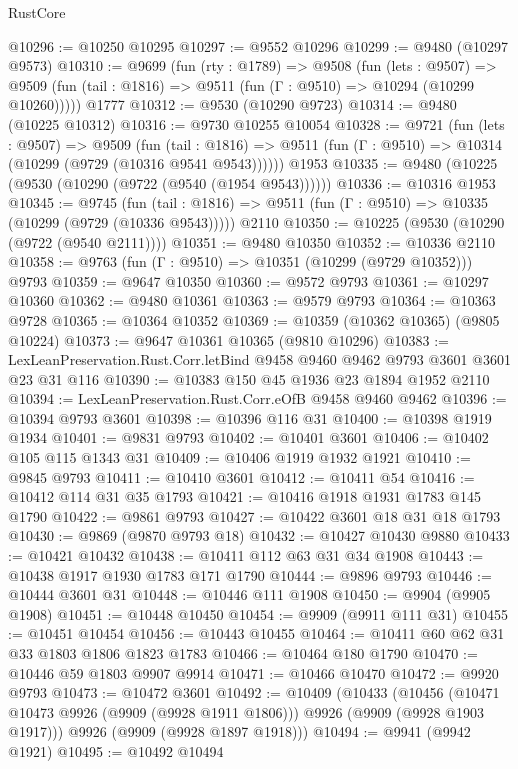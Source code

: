 \begin{lexlean}{RustCore}
\begin{coremodule}
@10296 := @10250 @10295
@10297 := @9552 @10296
@10299 := @9480 (@10297 @9573)
@10310 := @9699
    (fun (rty : @1789) =>
    @9508
      (fun (lets : @9507) =>
      @9509 (fun (tail : @1816) => @9511 (fun (Γ : @9510) => @10294 (@10299 @10260)))))
    @1777
@10312 := @9530 (@10290 @9723)
@10314 := @9480 (@10225 @10312)
@10316 := @9730 @10255 @10054
@10328 := @9721
    (fun (lets : @9507) =>
    @9509
      (fun (tail : @1816) =>
      @9511 (fun (Γ : @9510) => @10314 (@10299 (@9729 (@10316 @9541 @9543))))))
    @1953
@10335 := @9480 (@10225 (@9530 (@10290 (@9722 (@9540 (@1954 @9543))))))
@10336 := @10316 @1953
@10345 := @9745
    (fun (tail : @1816) => @9511 (fun (Γ : @9510) => @10335 (@10299 (@9729 (@10336 @9543)))))
    @2110
@10350 := @10225 (@9530 (@10290 (@9722 (@9540 @2111))))
@10351 := @9480 @10350
@10352 := @10336 @2110
@10358 := @9763 (fun (Γ : @9510) => @10351 (@10299 (@9729 @10352))) @9793
@10359 := @9647 @10350
@10360 := @9572 @9793
@10361 := @10297 @10360
@10362 := @9480 @10361
@10363 := @9579 @9793
@10364 := @10363 @9728
@10365 := @10364 @10352
@10369 := @10359 (@10362 @10365) (@9805 @10224)
@10373 := @9647 @10361 @10365 (@9810 @10296)
@10383 := LexLeanPreservation.Rust.Corr.letBind @9458 @9460 @9462 @9793 @3601 @3601 @23 @31 @116
@10390 := @10383 @150 @45 @1936 @23 @1894 @1952 @2110
@10394 := LexLeanPreservation.Rust.Corr.eOfB @9458 @9460 @9462
@10396 := @10394 @9793 @3601
@10398 := @10396 @116 @31
@10400 := @10398 @1919 @1934
@10401 := @9831 @9793
@10402 := @10401 @3601
@10406 := @10402 @105 @115 @1343 @31
@10409 := @10406 @1919 @1932 @1921
@10410 := @9845 @9793
@10411 := @10410 @3601
@10412 := @10411 @54
@10416 := @10412 @114 @31 @35 @1793
@10421 := @10416 @1918 @1931 @1783 @145 @1790
@10422 := @9861 @9793
@10427 := @10422 @3601 @18 @31 @18 @1793
@10430 := @9869 (@9870 @9793 @18)
@10432 := @10427 @10430 @9880
@10433 := @10421 @10432
@10438 := @10411 @112 @63 @31 @34 @1908
@10443 := @10438 @1917 @1930 @1783 @171 @1790
@10444 := @9896 @9793
@10446 := @10444 @3601 @31
@10448 := @10446 @111 @1908
@10450 := @9904 (@9905 @1908)
@10451 := @10448 @10450
@10454 := @9909 (@9911 @111 @31)
@10455 := @10451 @10454
@10456 := @10443 @10455
@10464 := @10411 @60 @62 @31 @33 @1803 @1806 @1823 @1783
@10466 := @10464 @180 @1790
@10470 := @10446 @59 @1803 @9907 @9914
@10471 := @10466 @10470
@10472 := @9920 @9793
@10473 := @10472 @3601
@10492 := @10409
    (@10433
      (@10456 (@10471 @10473 @9926 (@9909 (@9928 @1911 @1806))) @9926 (@9909 (@9928 @1903 @1917)))
      @9926
      (@9909 (@9928 @1897 @1918)))
@10494 := @9941 (@9942 @1921)
@10495 := @10492 @10494

\end{coremodule}
\end{lexlean}
